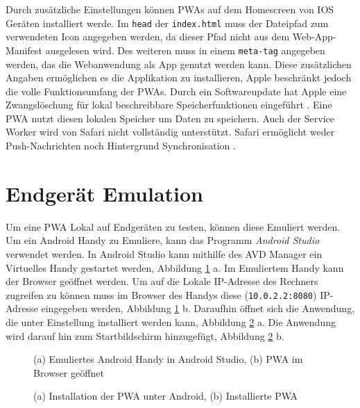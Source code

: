 Durch zusätzliche Einstellungen können PWAs auf dem Homescreen von IOS Geräten installiert werde. Im \texttt{head} der \texttt{index.html} muss der Dateipfad zum verwendeten Icon angegeben werden, da dieser Pfad nicht aus dem Web-App-Manifest ausgelesen wird. 
Des weiteren muss in einem \texttt{meta-tag} angegeben werden, das die Webanwendung als App genutzt werden kann. Diese zusätzlichen Angaben ermöglichen es die Applikation zu installieren, Apple beschränkt jedoch die volle Funktionsumfang der PWAs. Durch ein Softwareupdate hat Apple eine Zwangslöschung für lokal beschreibbare Speicherfunktionen eingeführt \cite{t3n2020}. Eine PWA nutzt diesen lokalen Speicher um Daten zu speichern. 
Auch der Service Worker wird von Safari nicht vollständig unterstützt. Safari ermöglicht weder Push-Nachrichten noch Hintergrund Synchronisation \cite{mediaevent}. 



\section{Endgerät Emulation }

Um eine PWA Lokal auf Endgeräten zu testen, können diese Emuliert werden.           
Um ein Android Handy zu Emuliere, kann das Programm \textit{Android Studio} verwendet werden. In Android Studio kann mithilfe des \ac{AVD Manager} ein Virtuelles Handy gestartet werden, Abbildung \ref{Android1} a. Im Emuliertem Handy kann der Browser geöffnet werden. Um auf die Lokale IP-Adresse des Rechners zugreifen zu können muss im Browser des Handys diese (\texttt{10.0.2.2:8080}) IP-Adresse eingegeben werden, Abbildung \ref{Android1} b. Daraufhin öffnet sich die Anwendung, die unter Einstellung installiert werden kann, Abbildung \ref{Android2} a. Die Anwendung wird darauf hin zum Startbildschirm hinzugefügt, Abbildung \ref{Android2} b.  

\begin{figure}[!htb]
    \centering
    \qquad
    \caption{(a) Emuliertes Android Handy in Android Studio, (b) PWA im Browser geöffnet}
    \label{Android1}
\end{figure}

\begin{figure}[!htb]
    \centering
    \qquad
    \caption{(a) Installation der PWA unter Android, (b) Installierte PWA }
    \label{Android2}
\end{figure}